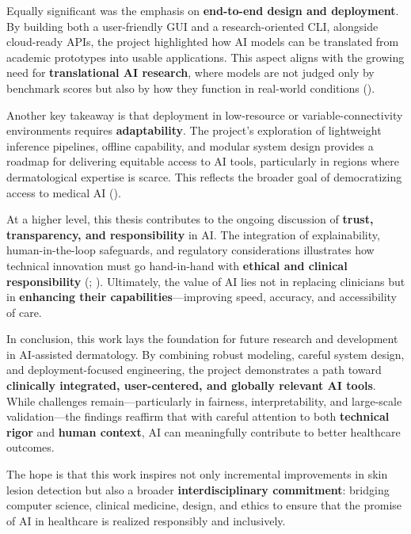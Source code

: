 \documentclass[
  12pt,
  oneside]{article}
\begin{document}
Equally significant was the emphasis on \textbf{end-to-end design and
deployment}. By building both a user-friendly GUI and a
research-oriented CLI, alongside cloud-ready APIs, the project
highlighted how AI models can be translated from academic prototypes
into usable applications. This aspect aligns with the growing need for
\textbf{translational AI research}, where models are not judged only by
benchmark scores but also by how they function in real-world conditions
().

Another key takeaway is that deployment in low-resource or
variable-connectivity environments requires \textbf{adaptability}. The
project's exploration of lightweight inference pipelines, offline
capability, and modular system design provides a roadmap for delivering
equitable access to AI tools, particularly in regions where
dermatological expertise is scarce. This reflects the broader goal of
democratizing access to medical AI
().

At a higher level, this thesis contributes to the ongoing discussion of
\textbf{trust, transparency, and responsibility} in AI. The integration
of explainability, human-in-the-loop safeguards, and regulatory
considerations illustrates how technical innovation must go hand-in-hand
with \textbf{ethical and clinical responsibility}
(;
). Ultimately, the
value of AI lies not in replacing clinicians but in \textbf{enhancing
their capabilities}---improving speed, accuracy, and accessibility of
care.

In conclusion, this work lays the foundation for future research and
development in AI-assisted dermatology. By combining robust modeling,
careful system design, and deployment-focused engineering, the project
demonstrates a path toward \textbf{clinically integrated, user-centered,
and globally relevant AI tools}. While challenges remain---particularly
in fairness, interpretability, and large-scale validation---the findings
reaffirm that with careful attention to both \textbf{technical rigor}
and \textbf{human context}, AI can meaningfully contribute to better
healthcare outcomes.

The hope is that this work inspires not only incremental improvements in
skin lesion detection but also a broader \textbf{interdisciplinary
commitment}: bridging computer science, clinical medicine, design, and
ethics to ensure that the promise of AI in healthcare is realized
responsibly and inclusively.
\end{document}
